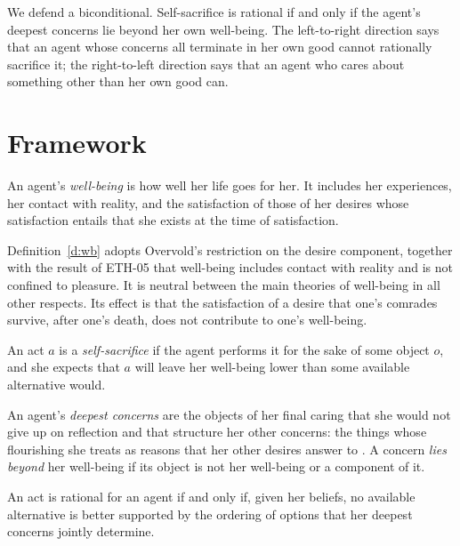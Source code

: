 \documentclass{situationist-preprint}
\begin{document}
We defend a biconditional. Self-sacrifice is rational if and only if the agent's deepest concerns lie beyond her own well-being. The left-to-right direction says that an agent whose concerns all terminate in her own good cannot rationally sacrifice it; the right-to-left direction says that an agent who cares about something other than her own good can.

\section{Framework}

\begin{definition}\label{d:wb}
An agent's \emph{well-being} is how well her life goes for her. It includes her experiences, her contact with reality, and the satisfaction of those of her desires whose satisfaction entails that she exists at the time of satisfaction.
\end{definition}

Definition~\ref{d:wb} adopts Overvold's restriction on the desire component, together with the result of ETH-05 that well-being includes contact with reality and is not confined to pleasure. It is neutral between the main theories of well-being in all other respects. Its effect is that the satisfaction of a desire that one's comrades survive, after one's death, does not contribute to one's well-being.

\begin{definition}\label{d:sac}
An act $a$ is a \emph{self-sacrifice} if the agent performs it for the sake of some object $o$, and she expects that $a$ will leave her well-being lower than some available alternative would.
\end{definition}

\begin{definition}\label{d:deep}
An agent's \emph{deepest concerns} are the objects of her final caring that she would not give up on reflection and that structure her other concerns: the things whose flourishing she treats as reasons that her other desires answer to \citep{Frankfurt1982}. A concern \emph{lies beyond} her well-being if its object is not her well-being or a component of it.
\end{definition}

\begin{principle}\label{p:rational}
An act is rational for an agent if and only if, given her beliefs, no available alternative is better supported by the ordering of options that her deepest concerns jointly determine.
\end{principle}
\end{document}
